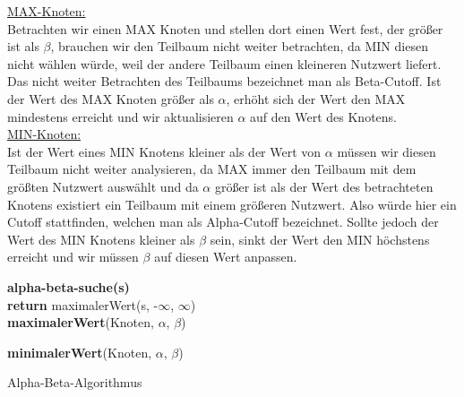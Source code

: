  \underline{MAX-Knoten:}\\
 Betrachten wir einen MAX Knoten und stellen dort einen Wert fest, der größer ist als $\beta$, brauchen wir den Teilbaum nicht weiter betrachten, da MIN diesen nicht wählen würde, weil der andere Teilbaum einen kleineren Nutzwert liefert. Das nicht weiter Betrachten des Teilbaums bezeichnet man als Beta-Cutoff. Ist der Wert des MAX Knoten größer als $\alpha$, erhöht sich der Wert den MAX mindestens erreicht und wir aktualisieren $\alpha$ auf den Wert des Knotens.  \\

 \underline{MIN-Knoten:}\\
 Ist der Wert eines MIN Knotens kleiner als der Wert von $\alpha$ müssen wir diesen Teilbaum nicht weiter analysieren, da MAX immer den Teilbaum mit dem größten Nutzwert auswählt und da $\alpha$ größer ist als der Wert des betrachteten Knotens existiert ein Teilbaum mit einem größeren Nutzwert. Also würde hier ein Cutoff stattfinden, welchen man als Alpha-Cutoff bezeichnet. Sollte jedoch der Wert des MIN Knotens kleiner als $\beta$ sein, sinkt der Wert den MIN höchstens erreicht und wir müssen $\beta$ auf diesen Wert anpassen.


 \begin{algorithm}
 	\textbf{alpha-beta-suche(s)}\\

 	\textbf{return} maximalerWert(s, -$\infty$, $\infty$)\\

 	\textbf{maximalerWert}(Knoten, $\alpha$, $\beta$)\\


	\textbf{minimalerWert}(Knoten, $\alpha$, $\beta$)\\

 	\caption{Alpha-Beta-Algorithmus}
\end{algorithm}

